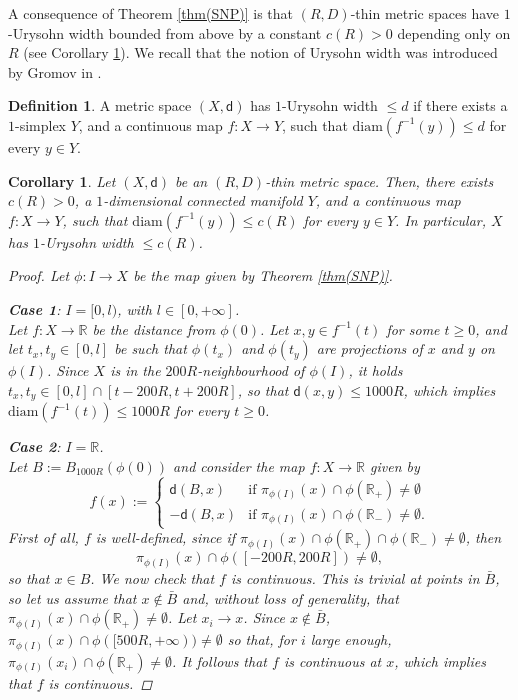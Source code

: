 \documentclass[10pt]{article}
\newtheorem{corollary}[thm]{Corollary}
\theoremstyle{definition}
\newtheorem{definition}[thm]{Definition}
\newcommand{\bb}[1]{\mathbb{#1}}
\newcommand{\sd}{\mathsf{d}}
\begin{document}
A consequence of Theorem \ref{thm(SNP)} is that $(R,D)$-thin metric spaces have $1$-Urysohn width bounded from above by a constant $ c(R)>0$ depending only on $R$ (see Corollary \ref{C|Urysohn}).
We recall that the notion of Urysohn width was introduced by Gromov in \cite{FillingGromov,widthGromov,LargeGromov}.

\begin{definition}
    A metric space $(X,\sd)$ has $1$-Urysohn width $\leq d$ if there exists a $1$-simplex $Y$, and a continuous map $f:X \to Y$, such that $\mathrm{diam}(f^{-1}(y)) \leq d$ for every $y \in Y$.
\end{definition}

\begin{corollary} \label{C|Urysohn}
    Let $(X,\sd)$ be an $(R,D)$-thin metric space. Then, there exists $c(R)>0$, a $1$-dimensional connected manifold $Y$, and a continuous map $f:X \to Y$, such that $\mathrm{diam}(f^{-1}(y)) \leq c(R)$ for every $y \in Y$. In particular,    
    $X$ has $1$-Urysohn width $\leq c(R)$.
    \begin{proof}
        Let $\phi:I \to X$ be the map given by Theorem \ref{thm(SNP)}. 

        \textbf{Case 1}: $I=[0,l)$, with $l \in [0,+\infty]$.
        \\Let $f:X \to \bb{R}$ be the distance from $\phi(0)$. Let $x,y \in f^{-1}(t)$ for some $t \geq 0$, and let $t_x,t_y \in [0,l]$ be such that $\phi(t_x)$ and $\phi(t_y)$ are projections of $x$ and $y$ on $\phi(I)$. Since $X$ is in the $200R$-neighbourhood of $\phi(I)$, it holds $t_x,t_y \in [0,l] \cap [t-200R,t+200R]$, so that $\sd(x,y) \leq 1000R$, which implies $\mathrm{diam}(f^{-1}(t)) \leq 1000R$ for every $t \geq 0$.

\textbf{Case 2}: $I=\bb{R}$.
\\Let $B:=B_{1000R}(\phi(0))$ and consider the map $f:X \to \bb{R}$ given by
        \[
        f(x):=
        \begin{cases}
    \sd(B,x) & \text{if } \pi_{\phi(I)}(x) \cap \phi(\bb{R}_+) \neq \emptyset
            \\
            -\sd(B,x) & \text{if } \pi_{\phi(I)}(x) \cap \phi(\bb{R}_-) \neq \emptyset.
         \end{cases}
        \]
        First of all, $f$ is well-defined, since if $\pi_{\phi(I)}(x) \cap \phi(\bb{R}_+) \cap \phi(\bb{R}_-) \neq \emptyset$, then 
        \[
        \pi_{\phi(I)}(x) \cap \phi([-200R,200R]) \neq \emptyset,
        \]
        so that $x \in B$. 
        We now check that $f$ is continuous. This is trivial at points in $\bar{B}$, so let us assume that $x \notin \bar{B}$ and, without loss of generality, that $\pi_{\phi(I)}(x) \cap \phi(\bb{R}_+) \neq \emptyset$. Let $x_i \to x$. Since $x \notin \bar{B}$, $\pi_{\phi(I)}(x) \cap \phi([500R,+\infty)) \neq \emptyset$ so that, for $i$ large enough, $\pi_{\phi(I)}(x_i) \cap \phi(\bb{R}_+) \neq \emptyset$. It follows that $f$ is continuous at $x$, which implies that $f$ is continuous. 
        

\end{proof}
\end{corollary}
\end{document}

